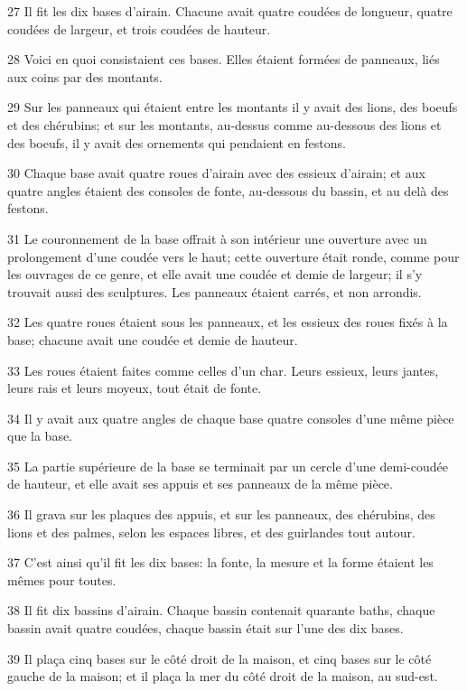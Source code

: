 \par 27 Il fit les dix bases d'airain. Chacune avait quatre coudées de longueur, quatre coudées de largeur, et trois coudées de hauteur.
\par 28 Voici en quoi consistaient ces bases. Elles étaient formées de panneaux, liés aux coins par des montants.
\par 29 Sur les panneaux qui étaient entre les montants il y avait des lions, des boeufs et des chérubins; et sur les montants, au-dessus comme au-dessous des lions et des boeufs, il y avait des ornements qui pendaient en festons.
\par 30 Chaque base avait quatre roues d'airain avec des essieux d'airain; et aux quatre angles étaient des consoles de fonte, au-dessous du bassin, et au delà des festons.
\par 31 Le couronnement de la base offrait à son intérieur une ouverture avec un prolongement d'une coudée vers le haut; cette ouverture était ronde, comme pour les ouvrages de ce genre, et elle avait une coudée et demie de largeur; il s'y trouvait aussi des sculptures. Les panneaux étaient carrés, et non arrondis.
\par 32 Les quatre roues étaient sous les panneaux, et les essieux des roues fixés à la base; chacune avait une coudée et demie de hauteur.
\par 33 Les roues étaient faites comme celles d'un char. Leurs essieux, leurs jantes, leurs rais et leurs moyeux, tout était de fonte.
\par 34 Il y avait aux quatre angles de chaque base quatre consoles d'une même pièce que la base.
\par 35 La partie supérieure de la base se terminait par un cercle d'une demi-coudée de hauteur, et elle avait ses appuis et ses panneaux de la même pièce.
\par 36 Il grava sur les plaques des appuis, et sur les panneaux, des chérubins, des lions et des palmes, selon les espaces libres, et des guirlandes tout autour.
\par 37 C'est ainsi qu'il fit les dix bases: la fonte, la mesure et la forme étaient les mêmes pour toutes.
\par 38 Il fit dix bassins d'airain. Chaque bassin contenait quarante baths, chaque bassin avait quatre coudées, chaque bassin était sur l'une des dix bases.
\par 39 Il plaça cinq bases sur le côté droit de la maison, et cinq bases sur le côté gauche de la maison; et il plaça la mer du côté droit de la maison, au sud-est.
